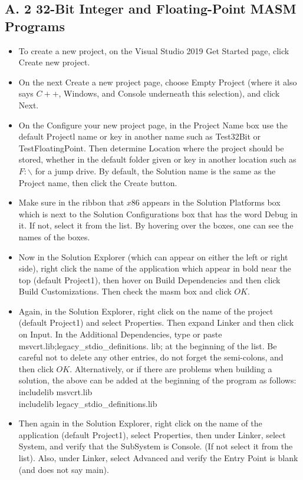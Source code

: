 \documentclass[10pt]{book}
\begin{document}
\begin{center}
\begin{center}
\begin{center}
\begin{center}
\begin{center}
\section*{A. 2 32-Bit Integer and Floating-Point MASM Programs}
\begin{itemize}
  \item To create a new project, on the Visual Studio 2019 Get Started page, click Create new project.
  \item On the next Create a new project page, choose Empty Project (where it also says $C++$, Windows, and Console underneath this selection), and click Next.
  \item On the Configure your new project page, in the Project Name box use the default Projectl name or key in another name such as Test32Bit or TestFloatingPoint. Then determine Location where the project should be stored, whether in the default folder given or key in another location such as $F: \backslash$ for a jump drive. By default, the Solution name is the same as the Project name, then click the Create button.
  \item Make sure in the ribbon that $x 86$ appears in the Solution Platforms box which is next to the Solution Configurations box that has the word Debug in it. If not, select it from the list. By hovering over the boxes, one can see the names of the boxes.
  \item Now in the Solution Explorer (which can appear on either the left or right side), right click the name of the application which appear in bold near the top (default Project1), then hover on Build Dependencies and then click Build Customizations. Then check the masm box and click $O K$.
  \item Again, in the Solution Explorer, right click on the name of the project (default Project1) and select Properties. Then expand Linker and then click on Input. In the Additional Dependencies, type or paste msvcrt.lib;legacy\_stdio\_definitions. lib; at the beginning of the list. Be careful not to delete any other entries, do not forget the semi-colons, and then click $O K$. Alternatively, or if there are problems when building a solution, the above can be added at the beginning of the program as follows:\\
includelib msvcrt.lib\\
includelib legacy\_stdio\_definitions.lib
  \item Then again in the Solution Explorer, right click on the name of the application (default Project1), select Properties, then under Linker, select System, and verify that the SubSystem is Console. (If not select it from the list). Also, under Linker, select Advanced and verify the Entry Point is blank (and does not say main).

\end{itemize}
\end{center}
\end{center}
\end{center}
\end{center}
\end{center}
\end{document}
